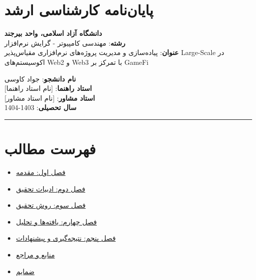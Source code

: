 \documentclass[
]{article}
\author{}
\date{}
\providecommand{\tightlist}{%
  \setlength{\itemsep}{0pt}\setlength{\parskip}{0pt}}
\begin{document}
\section{پایان‌نامه کارشناسی
ارشد}\label{ux67eux627ux6ccux627ux646ux646ux627ux645ux647-ux6a9ux627ux631ux634ux646ux627ux633ux6cc-ux627ux631ux634ux62f}

\textbf{دانشگاه آزاد اسلامی، واحد بیرجند}\\
\textbf{رشته}: مهندسی کامپیوتر - گرایش نرم‌افزار\\
\textbf{عنوان}: پیاده‌سازی و مدیریت پروژه‌های نرم‌افزاری مقیاس‌پذیر
Large-Scale در اکوسیستم‌های Web2 و Web3 با تمرکز بر GameFi

\textbf{نام دانشجو}: جواد کاوسی\\
\textbf{استاد راهنما}: {[}نام استاد راهنما{]}\\
\textbf{استاد مشاور}: {[}نام استاد مشاور{]}\\
\textbf{سال تحصیلی}: 1403-1404

\begin{center}\rule{0.5\linewidth}{0.5pt}\end{center}

\section{فهرست
مطالب}\label{ux641ux647ux631ux633ux62a-ux645ux637ux627ux644ux628}

\begin{itemize}
\tightlist
\item
  \hyperref[ux641ux635ux644-ux627ux648ux644-ux645ux642ux62fux645ux647]{فصل
  اول: مقدمه}
\item
  \hyperref[ux641ux635ux644-ux62fux648ux645-ux627ux62fux628ux6ccux627ux62a-ux62aux62dux642ux6ccux642]{فصل
  دوم: ادبیات تحقیق}
\item
  \hyperref[ux641ux635ux644-ux633ux648ux645-ux631ux648ux634-ux62aux62dux642ux6ccux642]{فصل
  سوم: روش تحقیق}
\item
  \hyperref[ux641ux635ux644-ux686ux647ux627ux631ux645-ux6ccux627ux641ux62aux647ux200cux647ux627-ux648-ux62aux62dux644ux6ccux644]{فصل
  چهارم: یافته‌ها و تحلیل}
\item
  \hyperref[ux641ux635ux644-ux67eux646ux62cux645-ux646ux62aux6ccux62cux647ux200cux6afux6ccux631ux6cc-ux648-ux67eux6ccux634ux646ux647ux627ux62fux627ux62a]{فصل
  پنجم: نتیجه‌گیری و پیشنهادات}
\item
  \hyperref[ux645ux646ux627ux628ux639-ux648-ux645ux631ux627ux62cux639]{منابع
  و مراجع}
\item
  \hyperref[ux636ux645ux627ux6ccux645]{ضمایم}
\end{itemize}
\end{document}
